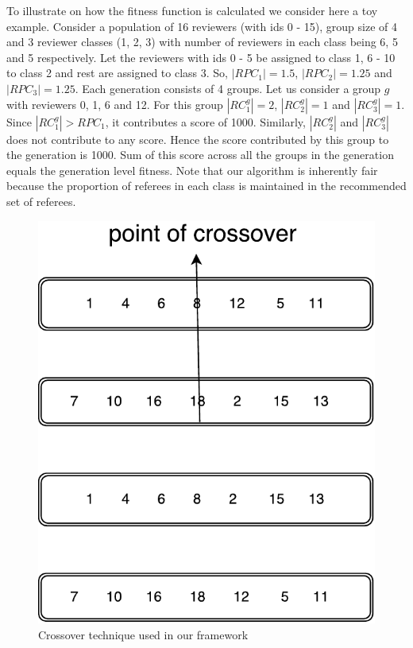 To illustrate on how the fitness function is calculated we consider here a toy example. Consider a population of 16 reviewers (with ids 0 - 15), group size of 4 and 3 reviewer classes (1, 2, 3) with number of reviewers in each class being 6, 5 and 5 respectively. Let the reviewers with ids 0 - 5 be assigned to class 1, 6 - 10 to class 2 and rest are assigned to class 3. 
So, $|RPC_1| = 1.5$, $|RPC_2| = 1.25$ and $|RPC_3| = 1.25$.
Each generation consists of 4 groups. Let us consider a group $g$ with reviewers 0, 1, 6 and 12. For this group  $|RC_1^{g}| = 2$, $|RC_2^{g}| = 1$ and $|RC_3^{g}| = 1$. Since $|RC_1^{g}| > RPC_1$, it contributes a score of 1000. Similarly, $|RC_2^{g}|$ and $|RC_3^{g}|$ does not contribute to any score. 
Hence the score contributed by this group to the generation is 1000. Sum of this score across all the groups in the generation equals the generation level fitness. 
Note that our algorithm is inherently fair because the proportion of referees in each class is maintained in the recommended set of referees.

\begin{figure}
\centering
\includegraphics[scale=0.32]{./texfiles/Chapter_4/cikm_17/figures/cross_over.pdf}
\caption{\label{c_o} Crossover technique used in our framework}
\vspace{4mm}
\end{figure}

